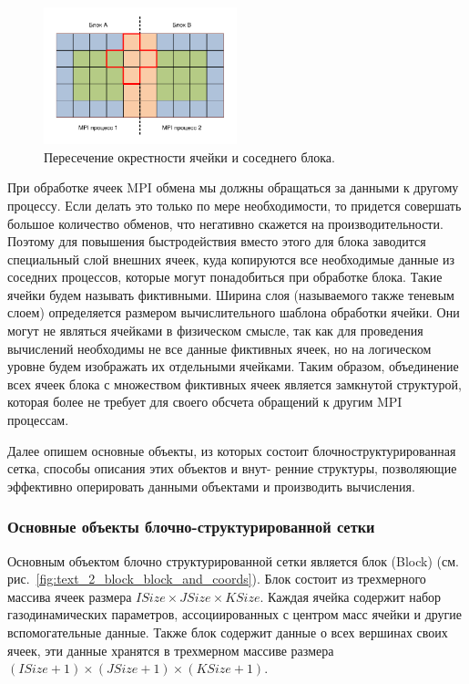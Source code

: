 \begin{figure}[ht]
	\centering
	\includegraphics[width=0.5\textwidth]{./pics/text_2_block/5-mpi-cells.pdf}
	\caption{Пересечение окрестности ячейки и соседнего блока.}
	\label{fig:text_2_block_mpi_cells}
\end{figure}

При обработке ячеек MPI обмена мы должны обращаться за данными к другому процессу.
Если делать это только по мере необходимости, то придется совершать большое количество обменов, что негативно скажется на производительности.
Поэтому для повышения быстродействия вместо этого для блока заводится специальный слой внешних ячеек, куда копируются все необходимые данные из соседних процессов, которые могут понадобиться при обработке блока.
Такие ячейки будем называть фиктивными.
Ширина слоя (называемого также теневым слоем) определяется размером вычислительного шаблона обработки ячейки.
Они могут не являться ячейками в физическом смысле, так как для проведения вычислений необходимы не все данные фиктивных ячеек, но на логическом уровне будем изображать их отдельными ячейками.
Таким образом, объединение всех ячеек блока с множеством фиктивных ячеек является замкнутой структурой, которая более не требует для своего обсчета обращений к другим MPI процессам.

Далее опишем основные объекты, из которых состоит блочноструктурированная сетка, способы описания этих объектов и внут- ренние структуры, позволяющие эффективно оперировать данными объектами и производить вычисления.

\subsubsection{Основные объекты блочно-структурированной сетки}

Основным объектом блочно структурированной сетки является блок (Block) (см. рис.~\ref{fig:text_2_block_block_and_coords}). 
Блок состоит из трехмерного массива ячеек размера $ISize \times JSize \times KSize$.
Каждая ячейка содержит набор газодинамических параметров, ассоциированных с центром масс ячейки и другие вспомогательные данные.
Также блок содержит данные о всех вершинах своих ячеек, эти данные хранятся в трехмерном массиве размера $(ISize + 1) \times (JSize + 1) \times (KSize + 1)$.

